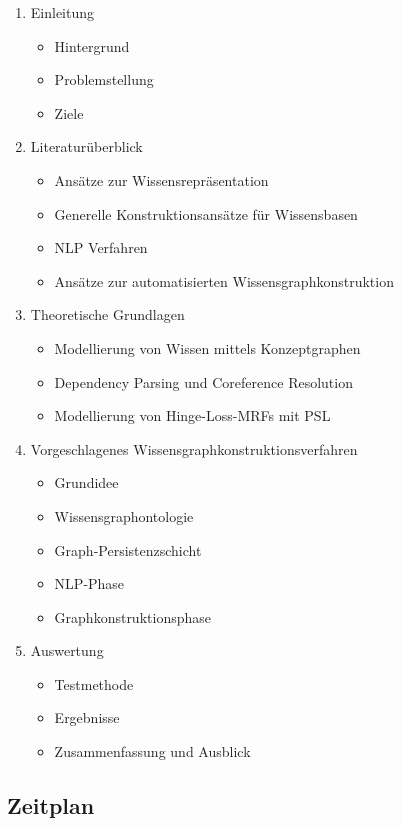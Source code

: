 \documentclass[11pt, a4paper]{scrreprt}
\begin{document}
\begin{enumerate}
	\item Einleitung
		\begin{itemize}
			\item Hintergrund
			\item Problemstellung
			\item Ziele
		\end{itemize}
	\item Literaturüberblick
		\begin{itemize}
			\item Ansätze zur Wissensrepräsentation
			\item Generelle Konstruktionsansätze für Wissensbasen
			\item NLP Verfahren
			\item Ansätze zur automatisierten Wissensgraphkonstruktion
		\end{itemize}
	\item Theoretische Grundlagen
		\begin{itemize}
			\item Modellierung von Wissen mittels Konzeptgraphen
			\item Dependency Parsing und Coreference Resolution
			\item Modellierung von Hinge-Loss-MRFs mit PSL
		\end{itemize}
	\item Vorgeschlagenes Wissensgraphkonstruktionsverfahren
		\begin{itemize}
			\item Grundidee
			\item Wissensgraphontologie
			\item Graph-Persistenzschicht
			\item NLP-Phase
			\item Graphkonstruktionsphase
		\end{itemize}
	\item Auswertung
		\begin{itemize}
			\item Testmethode
			\item Ergebnisse
			\item Zusammenfassung und Ausblick
		\end{itemize}
\end{enumerate}

\subsection{Zeitplan}
\end{document}
